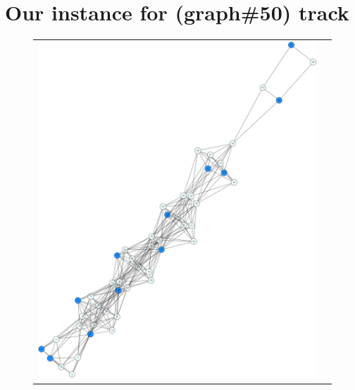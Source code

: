 \documentclass{article}
\begin{document}
\section{Our instance for (graph\#50) track}
	\begin{figure}[t]
		\begin{tabular}{cc}
			\begin{minipage}[t]{0.5\hsize}
				\centering
				\includegraphics[scale=0.2]{50_s.png}
			\end{minipage}
		&
			\begin{minipage}[t]{0.5\hsize}
				\centering

\end{minipage}
\end{tabular}
\end{figure}
\end{document}
